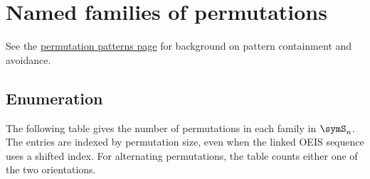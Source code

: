 

\section[namedPermutations]{Named families of permutations}

See the \hyperref[permutationPattern]{permutation patterns page}
for background on pattern containment and avoidance.

\subsection[permutationFamilyEnumeration]{Enumeration}

The following table gives the number of permutations in each family in
$\symS_n$.  The entries are indexed by permutation size, even when the linked
OEIS sequence uses a shifted index.  For alternating permutations, the table
counts either one of the two orientations.

